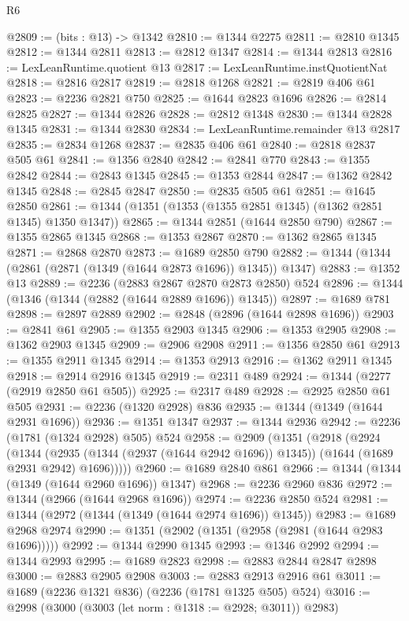 \begin{lexlean}{R6}
\begin{coremodule}
@2809 := (bits : @13) -> @1342
@2810 := @1344 @2275
@2811 := @2810 @1345
@2812 := @1344 @2811
@2813 := @2812 @1347
@2814 := @1344 @2813
@2816 := LexLeanRuntime.quotient @13
@2817 := LexLeanRuntime.instQuotientNat
@2818 := @2816 @2817
@2819 := @2818 @1268
@2821 := @2819 @406 @61
@2823 := @2236 @2821 @750
@2825 := @1644 @2823 @1696
@2826 := @2814 @2825
@2827 := @1344 @2826
@2828 := @2812 @1348
@2830 := @1344 @2828 @1345
@2831 := @1344 @2830
@2834 := LexLeanRuntime.remainder @13 @2817
@2835 := @2834 @1268
@2837 := @2835 @406 @61
@2840 := @2818 @2837 @505 @61
@2841 := @1356 @2840
@2842 := @2841 @770
@2843 := @1355 @2842
@2844 := @2843 @1345
@2845 := @1353 @2844
@2847 := @1362 @2842 @1345
@2848 := @2845 @2847
@2850 := @2835 @505 @61
@2851 := @1645 @2850
@2861 := @1344 (@1351 (@1353 (@1355 @2851 @1345) (@1362 @2851 @1345) @1350 @1347))
@2865 := @1344 @2851 (@1644 @2850 @790)
@2867 := @1355 @2865 @1345
@2868 := @1353 @2867
@2870 := @1362 @2865 @1345
@2871 := @2868 @2870
@2873 := @1689 @2850 @790
@2882 := @1344 (@1344 (@2861 (@2871 (@1349 (@1644 @2873 @1696)) @1345)) @1347)
@2883 := @1352 @13
@2889 := @2236 (@2883 @2867 @2870 @2873 @2850) @524
@2896 := @1344 (@1346 (@1344 (@2882 (@1644 @2889 @1696)) @1345))
@2897 := @1689 @781
@2898 := @2897 @2889
@2902 := @2848 (@2896 (@1644 @2898 @1696))
@2903 := @2841 @61
@2905 := @1355 @2903 @1345
@2906 := @1353 @2905
@2908 := @1362 @2903 @1345
@2909 := @2906 @2908
@2911 := @1356 @2850 @61
@2913 := @1355 @2911 @1345
@2914 := @1353 @2913
@2916 := @1362 @2911 @1345
@2918 := @2914 @2916 @1345
@2919 := @2311 @489
@2924 := @1344 (@2277 (@2919 @2850 @61 @505))
@2925 := @2317 @489
@2928 := @2925 @2850 @61 @505
@2931 := @2236 (@1320 @2928) @836
@2935 := @1344 (@1349 (@1644 @2931 @1696))
@2936 := @1351 @1347
@2937 := @1344 @2936
@2942 := @2236 (@1781 (@1324 @2928) @505) @524
@2958 := @2909
    (@1351
      (@2918
        (@2924
          (@1344
            (@2935 (@1344 (@2937 (@1644 @2942 @1696)) @1345))
            (@1644 (@1689 @2931 @2942) @1696)))))
@2960 := @1689 @2840 @861
@2966 := @1344 (@1344 (@1349 (@1644 @2960 @1696)) @1347)
@2968 := @2236 @2960 @836
@2972 := @1344 (@2966 (@1644 @2968 @1696))
@2974 := @2236 @2850 @524
@2981 := @1344 (@2972 (@1344 (@1349 (@1644 @2974 @1696)) @1345))
@2983 := @1689 @2968 @2974
@2990 := @1351 (@2902 (@1351 (@2958 (@2981 (@1644 @2983 @1696)))))
@2992 := @1344 @2990 @1345
@2993 := @1346 @2992
@2994 := @1344 @2993
@2995 := @1689 @2823
@2998 := @2883 @2844 @2847 @2898
@3000 := @2883 @2905 @2908
@3003 := @2883 @2913 @2916 @61
@3011 := @1689 (@2236 @1321 @836) (@2236 (@1781 @1325 @505) @524)
@3016 := @2998 (@3000 (@3003 (let norm : @1318 := @2928; @3011)) @2983)

\end{coremodule}
\end{lexlean}
